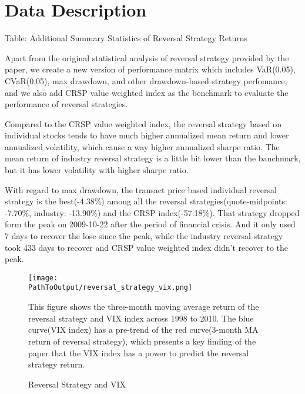 \documentclass{article}
\newcommand*{\PathToOutput}{../output/}
\begin{document}
\section{Data Description}

\begin{landscape}
\begin{table}
    \centering
    \caption*{Table: Additional Summary Statistics of Reversal Strategy Returns}

    \raggedright
    \small
    Apart from the original statistical analysis of reversal strategy provided by 
    the paper, we create a new version of performance matrix which includes VaR(0.05), 
    CVaR(0.05), max drawdown, and other drawdown-based strategy perfomance, and we also 
    add CRSP value weighted index as the benchmark to evaluate the performance of reversal strategies. 

    Compared to the CRSP value weighted index, the reversal strategy based on individual 
    stocks tends to have much higher annualized mean return and lower annualized volatility, 
    which cause a way higher annualized sharpe ratio. The mean return of industry reversal 
    strategy is a little bit lower than the banchmark, but it has lower volatility 
    with higher sharpe ratio.

    With regard to max drawdown, the transact price based individual reversal strategy 
    is the best(-4.38\%) among all the reversal strategies(quote-midpoints: -7.70\%, 
    industry: -13.90\%) and the CRSP index(-57.18\%). That strategy dropped form the 
    peak on 2009-10-22 after the period of financial crisis. And it only used 7 days to 
    recover the lose since the peak, while the industry reversal strategy took 433 days 
    to recover and CRSP value weighted index didn't recover to the peak.
    \medskip

    \centering
    
\end{table}

\begin{figure}
    \centering
    \texttt{[image: \\PathToOutput/reversal\_strategy\_vix.png]}
    \caption{Reversal Strategy and VIX}

    \medskip
    \small 
    This figure shows the three-month moving average return of the reversal strategy 
    and VIX index across 1998 to 2010. The blue curve(VIX index) has a pre-trend of 
    the red curve(3-month MA return of reversal strategy), which presents a key finding 
    of the paper that the VIX index has a power to predict the reversal strategy return.


\end{figure}
\end{landscape}
\end{document}

